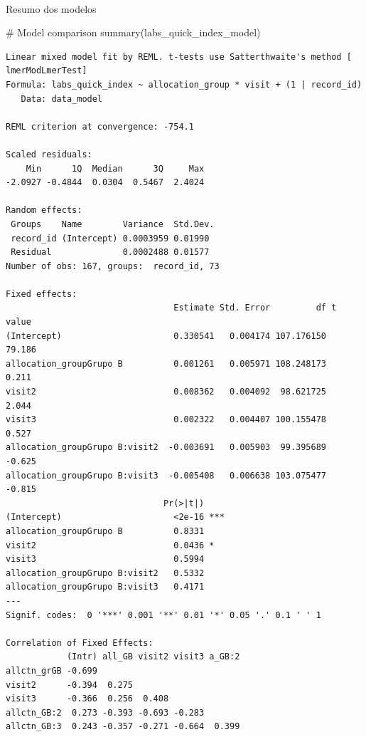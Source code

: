 \documentclass[
  letterpaper,
  DIV=11,
  numbers=noendperiod]{scrartcl}
\makeatletter
\let\oldparagraph\paragraph
\renewcommand{\paragraph}{
    \@ifstar
      \xxxParagraphStar
      \xxxParagraphNoStar
  }
\newcommand{\xxxParagraphStar}[1]{\oldparagraph*{#1}\mbox{}}
\newcommand{\xxxParagraphNoStar}[1]{\oldparagraph{#1}\mbox{}}
\newenvironment{Shaded}{\begin{snugshade}}{\end{snugshade}}
\newcommand{\CommentTok}[1]{\textcolor[rgb]{0.37,0.37,0.37}{#1}}
\newcommand{\FunctionTok}[1]{\textcolor[rgb]{0.28,0.35,0.67}{#1}}
\newcommand{\NormalTok}[1]{\textcolor[rgb]{0.00,0.23,0.31}{#1}}
\makeatother
\begin{document}
\paragraph{Resumo dos modelos}\label{resumo-dos-modelos-12}

\begin{Shaded}
\begin{Highlighting}[]
\CommentTok{\# Model comparison}
\FunctionTok{summary}\NormalTok{(labs\_quick\_index\_model)}
\end{Highlighting}
\end{Shaded}

\begin{verbatim}
Linear mixed model fit by REML. t-tests use Satterthwaite's method [
lmerModLmerTest]
Formula: labs_quick_index ~ allocation_group * visit + (1 | record_id)
   Data: data_model

REML criterion at convergence: -754.1

Scaled residuals: 
    Min      1Q  Median      3Q     Max 
-2.0927 -0.4844  0.0304  0.5467  2.4024 

Random effects:
 Groups    Name        Variance  Std.Dev.
 record_id (Intercept) 0.0003959 0.01990 
 Residual              0.0002488 0.01577 
Number of obs: 167, groups:  record_id, 73

Fixed effects:
                                 Estimate Std. Error         df t value
(Intercept)                      0.330541   0.004174 107.176150  79.186
allocation_groupGrupo B          0.001261   0.005971 108.248173   0.211
visit2                           0.008362   0.004092  98.621725   2.044
visit3                           0.002322   0.004407 100.155478   0.527
allocation_groupGrupo B:visit2  -0.003691   0.005903  99.395689  -0.625
allocation_groupGrupo B:visit3  -0.005408   0.006638 103.075477  -0.815
                               Pr(>|t|)    
(Intercept)                      <2e-16 ***
allocation_groupGrupo B          0.8331    
visit2                           0.0436 *  
visit3                           0.5994    
allocation_groupGrupo B:visit2   0.5332    
allocation_groupGrupo B:visit3   0.4171    
---
Signif. codes:  0 '***' 0.001 '**' 0.01 '*' 0.05 '.' 0.1 ' ' 1

Correlation of Fixed Effects:
            (Intr) all_GB visit2 visit3 a_GB:2
allctn_grGB -0.699                            
visit2      -0.394  0.275                     
visit3      -0.366  0.256  0.408              
allctn_GB:2  0.273 -0.393 -0.693 -0.283       
allctn_GB:3  0.243 -0.357 -0.271 -0.664  0.399
\end{verbatim}
\end{document}
